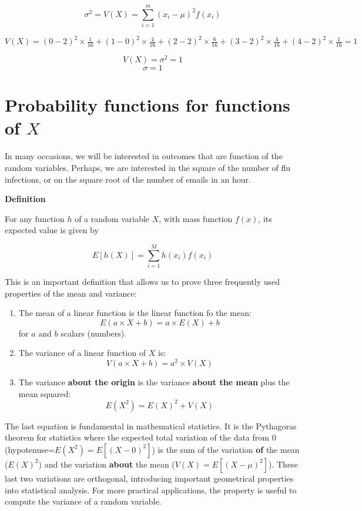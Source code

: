 \documentclass[
]{book}
\begin{document}
\[\sigma^2 =V(X)=\sum_{i=1}^m (x_i-\mu)^2 f(x_i)\]

\(V(X)=(0-2)^2 \times \frac{1}{16} + (1-0)^2 \times \frac{4}{16} + (2-2)^2 \times \frac{6}{16} + (3-2)^2 \times \frac{4}{16} + (4-2)^2 \times \frac{1}{16} =1\)

\[V(X)=\sigma^2=1\]
\[\sigma=1\]

\hypertarget{probability-functions-for-functions-of-x}{%
\section{\texorpdfstring{Probability functions for functions of \(X\)}{Probability functions for functions of X}}\label{probability-functions-for-functions-of-x}}

In many occasions, we will be interested in outcomes that are function of the random variables. Perhaps, we are interested in the square of the number of flu infections, or on the square root of the number of emails in an hour.

\textbf{Definition}

For any function \(h\) of a random variable \(X\), with mass function \(f(x)\), its expected value is given by

\[ E[h(X)]= \sum_{i=1}^M h(x_i) f(x_i) \]

This is an important definition that allows us to prove three frequently used properties of the mean and variance:

\begin{enumerate}
\def\labelenumi{\arabic{enumi})}
\item
  The mean of a linear function is the linear function fo the mean: \[E(a\times X +b)= a\times E(X) +b\] for \(a\) and \(b\) scalars (numbers).
\item
  The variance of a linear function of \(X\) is:\[V(a\times X +b)= a^2\times V(X)\]
\item
  The variance \textbf{about the origin} is the variance \textbf{about the mean} plus the mean squared: \[E(X^2)=E(X)^2 + V(X)\]
\end{enumerate}

The last equation is fundamental in mathematical statistics. It is the Pythagoras theorem for statistics where the expected total variation of the data from \(0\) (hypotenuse=\(E(X^2)=E[(X-0)^2]\)) is the sum of the variation \textbf{of} the mean (\(E(X)^2\)) and the variation \textbf{about} the mean (\(V(X)=E[(X-\mu)^2]\)). These last two variations are orthogonal, introducing important geometrical properties into statistical analysis. For more practical applications, the property is useful to compute the variance of a random variable.
\end{document}
